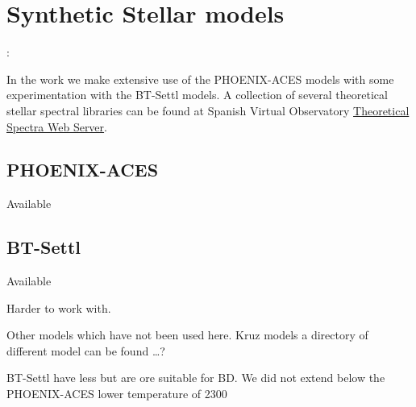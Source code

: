 
\section{Synthetic Stellar models}:

In the work we make extensive use of the {PHOENIX-ACES} models with some experimentation with the {BT-Settl} models.
A collection of several theoretical stellar spectral libraries can be found at Spanish Virtual Observatory \href{http://svo2.cab.inta-csic.es/theory/newov/index.php}{Theoretical Spectra Web Server}.



\subsection{PHOENIX-ACES}

Available 




\subsection{BT-Settl}

Available 

Harder to work with.

Other models which have not been used here.
Kruz models a directory of different model can be found \ldots{}?

BT-Settl have less but are ore suitable for BD.
We did not extend below the {PHOENIX-ACES} lower temperature of 2300\K{}
